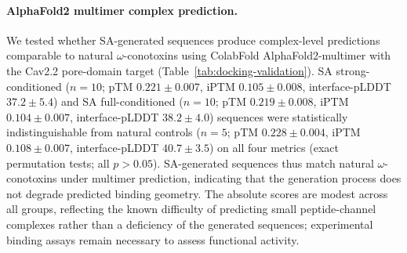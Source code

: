 \paragraph{AlphaFold2 multimer complex prediction.}
We tested whether SA-generated sequences produce complex-level predictions comparable to natural $\omega$-conotoxins using ColabFold AlphaFold2-multimer with the Cav2.2 pore-domain target (Table~\ref{tab:docking-validation}). SA strong-conditioned ($n=10$; pTM $0.221\pm0.007$, iPTM $0.105\pm0.008$, interface-pLDDT $37.2\pm5.4$) and SA full-conditioned ($n=10$; pTM $0.219\pm0.008$, iPTM $0.104\pm0.007$, interface-pLDDT $38.2\pm4.0$) sequences were statistically indistinguishable from natural controls ($n=5$; pTM $0.228\pm0.004$, iPTM $0.108\pm0.007$, interface-pLDDT $40.7\pm3.5$) on all four metrics (exact permutation tests; all $p>0.05$). SA-generated sequences thus match natural $\omega$-conotoxins under multimer prediction, indicating that the generation process does not degrade predicted binding geometry. The absolute scores are modest across all groups, reflecting the known difficulty of predicting small peptide-channel complexes rather than a deficiency of the generated sequences; experimental binding assays remain necessary to assess functional activity.


